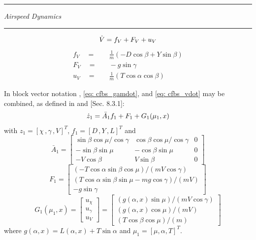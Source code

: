 \documentclass[12pt]{ucthesis}
\begin{document}
\begin{center} {\color{lightgray}\rule[2pt]{2.5in}{1pt}} \textit{Airspeed Dynamics} {\color{lightgray}\rule[2pt]{2.5in}{1pt}}  \end{center}
	\begin{equation} \label{eq: cfbs_vdot}
		\dot{V} = f_{V} + F_{V} + u_{V} \\
	\end{equation}
	\begin{align}
		\label{eq: cfbs_fV} 	f_{V} \quad =& \quad 		\frac{1}{m}\left(- D\cos\beta + Y\sin\beta \right) \\
		\label{eq: cfbs_FV} 	F_{V} \quad =& \quad 		- g\sin\gamma \\
		\label{eq: cfbs_uV} 	u_{V} \quad =& \quad 		\frac{1}{m} \left( T\cos\alpha\cos\beta \right)
	\end{align}

In block vector notation , \ref{eq: cfbs_gamdot}, and \ref{eq: cfbs_vdot} may be combined, as defined in \citet{Farrell2005} and \citet{Farrell2006}[Sec. 8.3.1]:
	\begin{equation} \label{eq: cfbs_outer_blk_dyn}
		\dot{z}_1 = \bar{A}_1 f_1 + F_1 + G_1(\mu_1,x) \\
	\end{equation}
with $z_1 = [\chi\,,\gamma\,,V]^T$, $f_1 = [D\,,Y\,,L]^T$  and
	\begin{equation} \label{eq: cfbs_outer_blk_dyn_A}
		\bar{A}_1 = \left[ \begin{array}{ccc} \sin\beta \cos\mu / \cos\gamma & \cos\beta \cos\mu / \cos\gamma & 0 \\ -\sin\beta\sin\mu & -\cos\beta\sin\mu & 0 \\ -V\cos\beta & V\sin\beta & 0 \end{array} \right] 
	\end{equation}
	\begin{equation} \label{eq: cfbs_outer_blk_dyn_F1}
		F_1 = \left[ \begin{array}{c} (-T\cos\alpha\sin\beta\cos\mu) / (mV\cos\gamma) \\ (T\cos\alpha\sin\beta\sin\mu -mg\cos\gamma) / (mV) \\ -g\sin\gamma  \end{array} \right] 
	\end{equation}
	\begin{equation} \label{eq: cfbs_outer_blk_dyn_G1}
		G_1(\mu_1,x) = \left[ \begin{array}{c} u_{\chi} \\ u_{\gamma} \\ u_{V} \end{array} \right] = \left[ \begin{array}{c} (g(\alpha,x)\sin\mu) / (mV\cos\gamma) \\ (g(\alpha,x)\cos\mu) / (mV)  \\ (T\cos\beta\cos\mu) / (m) \end{array} \right]
	\end{equation}
where $g(\alpha,x) = L(\alpha,x)+T\sin\alpha$ and $\mu_1 = [\mu,\alpha,T]^T$.
%
\end{document}
